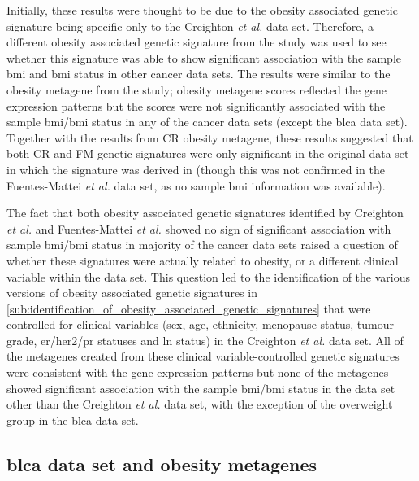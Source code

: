 Initially, these results were thought to be due to the obesity associated genetic signature being specific only to the Creighton \textit{et al.} data set.
Therefore, a different obesity associated genetic signature from the \citet{Fuentes-Mattei2014} study was used to see whether this signature was able to show significant association with the sample \gls{bmi} and \gls{bmi} status in other cancer data sets.
The results were similar to the obesity metagene from the \citet{Creighton2012} study; obesity metagene scores reflected the gene expression patterns but the scores were not significantly associated with the sample \gls{bmi}/\gls{bmi} status in any of the cancer data sets (except the \gls{blca} data set).
Together with the results from CR obesity metagene, these results suggested that both CR and FM genetic signatures were only significant in the original data set in which the signature was derived in (though this was not confirmed in the Fuentes-Mattei \textit{et al.} data set, as no sample \gls{bmi} information was available).

The fact that both obesity associated genetic signatures identified by Creighton \textit{et al.} and Fuentes-Mattei \textit{et al.} showed no sign of significant association with sample \gls{bmi}/\gls{bmi} status in majority of the cancer data sets raised a question of whether these signatures were actually related to obesity, or a different clinical variable within the data set.
This question led to the identification of the various versions of obesity associated genetic signatures in \cref{sub:identification_of_obesity_associated_genetic_signatures} that were controlled for clinical variables (sex, age, ethnicity, menopause status, tumour grade, \gls{er}/\gls{her2}/\gls{pr} statuses and \gls{ln} status) in the Creighton \textit{et al.} data set.
All of the metagenes created from these clinical variable-controlled genetic signatures were consistent with the gene expression patterns but none of the metagenes showed significant association with the sample \gls{bmi}/\gls{bmi} status in the data set other than the Creighton \textit{et al.} data set, with the exception of the overweight group in the \gls{blca} data set.

\subsection{\gls{blca} data set and obesity metagenes}
\label{sub:blca_and_obesity_metagenes}

